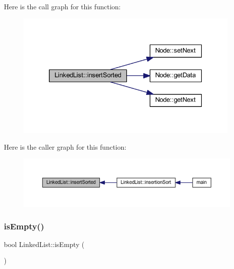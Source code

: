 Here is the call graph for this function\+:
\nopagebreak
\begin{figure}[H]
\begin{center}
\leavevmode
\includegraphics[width=314pt]{class_linked_list_ac517f07c7f197202fa085246fb3f07e8_cgraph}
\end{center}
\end{figure}
Here is the caller graph for this function\+:
\nopagebreak
\begin{figure}[H]
\begin{center}
\leavevmode
\includegraphics[width=350pt]{class_linked_list_ac517f07c7f197202fa085246fb3f07e8_icgraph}
\end{center}
\end{figure}
\mbox{\label{class_linked_list_a03ff22f881325da2d37f640ab2380bf2}} 
\subsubsection{\texorpdfstring{is\+Empty()}{isEmpty()}}
{\footnotesize\ttfamily bool Linked\+List\+::is\+Empty (\begin{DoxyParamCaption}{ }\end{DoxyParamCaption})}

\mbox{\label{class_linked_list_a1a5c8f3b415fa55f7e876cf4a01f3380}} 
